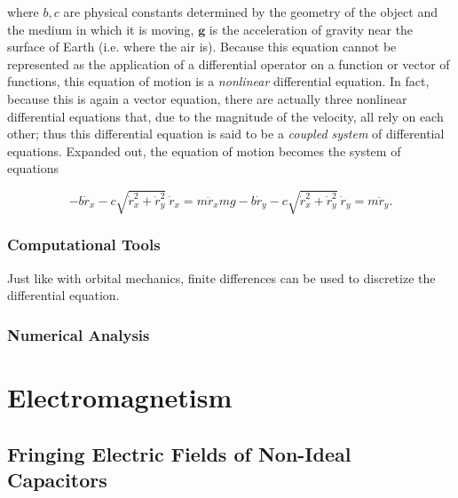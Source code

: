 \documentclass{report}
\begin{document}
            where $b, c$ are physical constants determined by the geometry of the object and the medium in which it is moving, $\mathbf{g}$ is the acceleration of gravity near the surface of Earth (i.e. where the air is).  Because this equation cannot be represented as the application of a differential operator on a function or vector of functions, this equation of motion is a \emph{nonlinear} differential equation.  In fact, because this is again a vector equation, there are actually three nonlinear differential equations that, due to the magnitude of the velocity, all rely on each other; thus this differential equation is said to be a \emph{coupled system} of differential equations.  Expanded out, the equation of motion becomes the system of equations

            \begin{subequations}
                \begin{equation}
                    - b \dot{r}_x - c \sqrt{\dot{r}_x^2 + \dot{r}_y^2} \ \dot{r}_x = m \ddot{r}_x
                \end{equation}
                \begin{equation}
                    m g - b \dot{r}_y - c \sqrt{\dot{r}_x^2 + \dot{r}_y^2} \ \dot{r}_y = m \ddot{r}_y.
                \end{equation}
            \end{subequations}

        \subsection{Computational Tools}

            Just like with orbital mechanics, finite differences can be used to discretize the differential equation.

        \subsection{Numerical Analysis}

\chapter{Electromagnetism}

\pagebreak

    \section{Fringing Electric Fields of Non-Ideal Capacitors}
\end{document}
